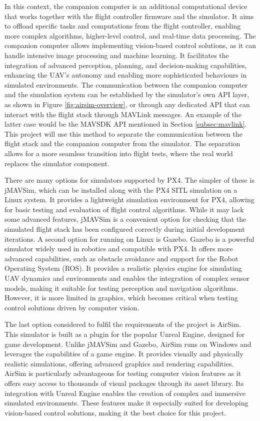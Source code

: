 In this context, the companion computer is an additional computational device that works together with the flight controller firmware and the simulator. It aims to offload specific tasks and computations from the flight controller, enabling more complex algorithms, higher-level control, and real-time data processing. The companion computer allows implementing vision-based control solutions, as it can handle intensive image processing and machine learning. It facilitates the integration of advanced perception, planning, and decision-making capabilities, enhancing the UAV's autonomy and enabling more sophisticated behaviours in simulated environments.
The communication between the companion computer and the simulation system can be established by the simulator’s own API layer, as shown in Figure \ref{fig:airsim-overview}, or through any dedicated API that can interact with the flight stack through MAVLink messages.
An example of the latter case would be the MAVSDK API mentioned in Section \ref{subsec:mavlink}.
This project will use this method to separate the communication between the flight stack and the companion computer from the simulator.
The separation allows for a more seamless transition into flight tests, where the real world replaces the simulator component.

There are many options for simulators supported by PX4.
The simpler of these is jMAVSim, which can be installed along with the PX4 SITL simulation on a Linux system. It provides a lightweight simulation environment for PX4, allowing for basic testing and evaluation of flight control algorithms. While it may lack some advanced features, jMAVSim is a convenient option for checking that the simulated flight stack has been configured correctly during initial development iterations.
A second option for running on Linux is Gazebo. Gazebo is a powerful simulator widely used in robotics and compatible with PX4. It offers more advanced capabilities, such as obstacle avoidance and support for the Robot Operating System (ROS). It provides a realistic physics engine for simulating UAV dynamics and environments and enables the integration of complex sensor models, making it suitable for testing perception and navigation algorithms. However, it is more limited in graphics, which becomes critical when testing control solutions driven by computer vision.

The last option considered to fulfil the requirements of the project is AirSim. This simulator is built as a plugin for the popular Unreal Engine, designed for game development. Unlike jMAVSim and Gazebo, AirSim runs on Windows and leverages the capabilities of a game engine. It provides visually and physically realistic simulations, offering advanced graphics and rendering capabilities. AirSim is particularly advantageous for testing computer vision features as it offers easy access to thousands of visual packages through its asset library. Its integration with Unreal Engine enables the creation of complex and immersive simulated environments. These features make it especially suited for developing vision-based control solutions, making it the best choice for this project.


